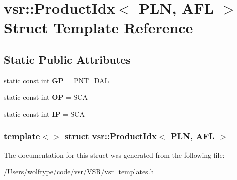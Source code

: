 \hypertarget{structvsr_1_1_product_idx_3_01_p_l_n_00_01_a_f_l_01_4}{\section{vsr\-:\-:Product\-Idx$<$ P\-L\-N, A\-F\-L $>$ Struct Template Reference}
\label{structvsr_1_1_product_idx_3_01_p_l_n_00_01_a_f_l_01_4}
}
\subsection*{Static Public Attributes}
\begin{DoxyCompactItemize}
\item 
\hypertarget{structvsr_1_1_product_idx_3_01_p_l_n_00_01_a_f_l_01_4_acdb23fa1cc4a57680626717033e6b1f5}{static const int {\bfseries G\-P} = P\-N\-T\-\_\-\-D\-A\-L}\label{structvsr_1_1_product_idx_3_01_p_l_n_00_01_a_f_l_01_4_acdb23fa1cc4a57680626717033e6b1f5}

\item 
\hypertarget{structvsr_1_1_product_idx_3_01_p_l_n_00_01_a_f_l_01_4_a25d0f59e3d7f6c71abe8ac92485e8694}{static const int {\bfseries O\-P} = S\-C\-A}\label{structvsr_1_1_product_idx_3_01_p_l_n_00_01_a_f_l_01_4_a25d0f59e3d7f6c71abe8ac92485e8694}

\item 
\hypertarget{structvsr_1_1_product_idx_3_01_p_l_n_00_01_a_f_l_01_4_a4f38c917c93b76c74592d19afddefd91}{static const int {\bfseries I\-P} = S\-C\-A}\label{structvsr_1_1_product_idx_3_01_p_l_n_00_01_a_f_l_01_4_a4f38c917c93b76c74592d19afddefd91}

\end{DoxyCompactItemize}
\subsubsection*{template$<$$>$ struct vsr\-::\-Product\-Idx$<$ P\-L\-N, A\-F\-L $>$}



The documentation for this struct was generated from the following file\-:\begin{DoxyCompactItemize}
\item 
/\-Users/wolftype/code/vsr/\-V\-S\-R/vsr\-\_\-templates.\-h\end{DoxyCompactItemize}

